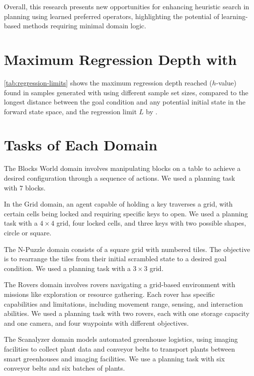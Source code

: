 \documentclass[ppgc,diss,english]{iiufrgs}
\begin{document}
Overall, this research presents new opportunities for enhancing heuristic search in planning using learned preferred operators, highlighting the potential of learning-based methods requiring minimal domain logic.




\appendix

\chapter{Maximum Regression Depth with \bfsrs}
\label{cha:max_reg_depth}

\cref{tab:regression-limits} shows the maximum regression depth reached ($h$-value) found in samples generated with \bfsrs using different sample set sizes, compared to the longest distance \distfarthest between the goal condition and any potential initial state in the forward state space, and the regression limit $L$ by \citet{Bettker.etal/2022}.



\chapter{Tasks of Each Domain}
\label{cha:tasks_each_domain}
The Blocks World domain involves manipulating blocks on a table to achieve a desired configuration through a sequence of actions. We used a planning task with $7$ blocks.

In the Grid domain, an agent capable of holding a key traverses a grid, with certain cells being locked and requiring specific keys to open. We used a planning task with a $4 \times 4$ grid, four locked cells, and three keys with two possible shapes, circle or square.

The N-Puzzle domain consists of a square grid with numbered tiles. The objective is to rearrange the tiles from their initial scrambled state to a desired goal condition. We used a planning task with a $3 \times 3$ grid.

The Rovers domain involves rovers navigating a grid-based environment with missions like exploration or resource gathering. Each rover has specific capabilities and limitations, including movement range, sensing, and interaction abilities. We used a planning task with two rovers, each with one storage capacity and one camera, and four waypoints with different objectives.

The Scanalyzer domain models automated greenhouse logistics, using imaging facilities to collect plant data and conveyor belts to transport plants between smart greenhouses and imaging facilities. We use a planning task with six conveyor belts and six batches of plants.
\end{document}
